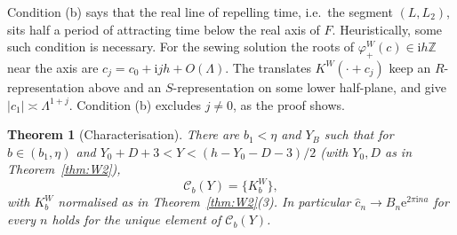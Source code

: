 \documentclass[11pt,a4paper]{article}
\newtheorem{theorem}{Theorem}
\theoremstyle{definition}
\newcommand{\Rr}{R}
\newcommand{\Kk}{K}
\newcommand{\eee}{\mathrm{e}}
\newcommand{\ii}{\mathrm{i}}
\begin{document}
Condition (b) says that the real line of repelling time, i.e.\ the segment
$(L,L_2)$, sits half a period of attracting time below the real axis of $F$.
Heuristically, some such condition is necessary.  For the sewing solution the
roots of $\varphi^W_+(c)\in\ii h\mathbb Z$ near the axis are
$c_j=c_0+\ii jh+O(\Lambda)$.  The translates $\Kk^W(\cdot+c_j)$ keep an
$\Rr$-representation above and an $S$-representation on some lower half-plane,
and give $|c_1|\asymp\Lambda^{1+j}$.  Condition (b) excludes $j\ne0$, as the
proof shows.

\begin{theorem}[Characterisation]\label{thm:char}
There are $b_1<\eta$ and $Y_B$ such that for $b\in(b_1,\eta)$ and
$Y_0+D+3<Y<(h-Y_0-D-3)/2$ (with $Y_0,D$ as in Theorem~\ref{thm:W2}),
\[
 \mathcal C_b(Y)=\{\Kk^W_b\},
\]
with $\Kk^W_b$ normalised as in Theorem~\ref{thm:W2}(3).  In particular
$\hat c_n\to B_n\eee^{2\pi\ii na}$ for every $n$ holds for the unique element
of $\mathcal C_b(Y)$.
\end{theorem}
\end{document}
